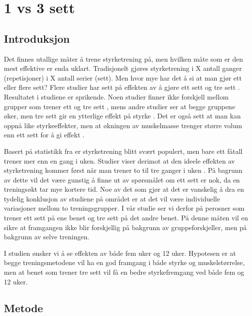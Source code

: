 \documentclass[
]{book}
\begin{document}
\hypertarget{vs-3-sett}{%
\chapter{1 vs 3 sett}\label{vs-3-sett}}

\hypertarget{introduksjon-2}{%
\section{Introduksjon}\label{introduksjon-2}}

Det finnes utallige måter å trene styrketrening på, men hvilken måte som er den mest effektive er enda uklart. Tradisjonelt gjøres styrketrening i X antall ganger (repetisjoner) i X antall serier (sett). Men hvor mye har det å si at man gjør ett eller flere sett? Flere studier har sett på effekten av å gjøre ett sett og tre sett \citep{galvão2005, hass2000, krieger2009, radaelli2014, schoenfeld2019}. Resultatet i studiene er sprikende. Noen studier finner ikke forskjell mellom grupper som trener ett og tre sett \citep{hass2000, radaelli2014}, mens andre studier ser at begge gruppene øker, men tre sett gir en ytterlige effekt på styrke \citep{krieger2009, galvão2005}. Det er også sett at man kan oppnå like styrkeeffekter, men at økningen av muskelmasse trenger større volum enn ett sett for å gi effekt \citep{schoenfeld2019}.

Basert på statistikk fra \citet{statistisksentralbyrå2019} er styrketrening blitt svært populert, men bare ett fåtall trener mer enn en gang i uken. Studier viser derimot at den ideele effekten av styrketrening kommer først når man trener to til tre ganger i uken \citep{schoenfeld2016}. På bagrunn av dette vil det være gunstig å finne ut av spørsmålet om ett sett er nok, da en treningsøkt tar mye kortere tid. Noe av det som gjør at det er vanskelig å dra en tydelig konklusjon av studiene på området er at det vil være individuelle variasjoner mellom to treningsgrupper. I vår studie ser vi derfor på perosner som trener ett sett på ene benet og tre sett på det andre benet. På denne måten vil en sikre at framgangen ikke blir forskjellig på bakgrunn av gruppeforskjeller, men på bakgrunn av selve treningen.

I studien ønsker vi å se effekten av både fem uker og 12 uker. Hypotesen er at begge treningsmetodene vil ha en god framgang i både styrke og muskelstørrelse, men at benet som trener tre sett vil få en bedre styrkefremgang ved både fem og 12 uker.

\hypertarget{metode-3}{%
\section{Metode}\label{metode-3}}
\end{document}
